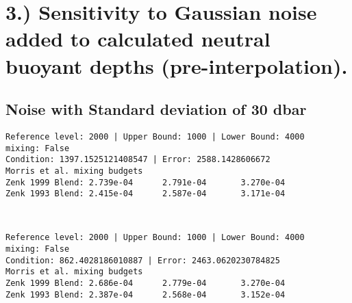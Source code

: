 \documentclass[11pt]{article}
\begin{document}
    \hypertarget{sensitivity-to-gaussian-noise-added-to-calculated-neutral-buoyant-depths-pre-interpolation.}{%
\section{3.) Sensitivity to Gaussian noise added to calculated neutral
buoyant depths
(pre-interpolation).}\label{sensitivity-to-gaussian-noise-added-to-calculated-neutral-buoyant-depths-pre-interpolation.}}

    \hypertarget{noise-with-standard-deviation-of-30-dbar}{%
\subsection{Noise with Standard deviation of 30
dbar}\label{noise-with-standard-deviation-of-30-dbar}}

    \begin{Verbatim}[commandchars=\\\{\}]
Reference level: 2000 | Upper Bound: 1000 | Lower Bound: 4000
mixing: False
Condition: 1397.1525121408547 | Error: 2588.1428606672
Morris et al. mixing budgets
Zenk 1999 Blend: 2.739e-04      2.791e-04       3.270e-04
Zenk 1993 Blend: 2.415e-04      2.587e-04       3.171e-04
    \end{Verbatim}

    \begin{center}
    \end{center}
    { \hspace*{\fill} \\}
    
    \begin{Verbatim}[commandchars=\\\{\}]
Reference level: 2000 | Upper Bound: 1000 | Lower Bound: 4000
mixing: False
Condition: 862.4028186010887 | Error: 2463.0620230784825
Morris et al. mixing budgets
Zenk 1999 Blend: 2.686e-04      2.779e-04       3.270e-04
Zenk 1993 Blend: 2.387e-04      2.568e-04       3.152e-04
    \end{Verbatim}

    \begin{center}
    \end{center}
    { \hspace*{\fill} \\}
    
\end{document}
